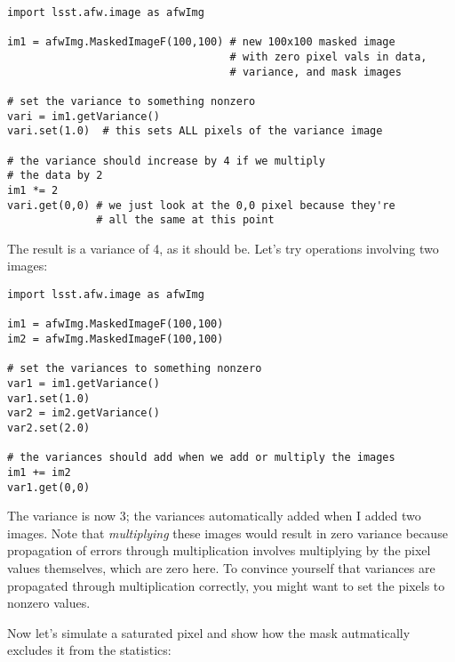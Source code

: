 \begin{verbatim}
import lsst.afw.image as afwImg

im1 = afwImg.MaskedImageF(100,100) # new 100x100 masked image
                                   # with zero pixel vals in data,
                                   # variance, and mask images

# set the variance to something nonzero
vari = im1.getVariance()
vari.set(1.0)  # this sets ALL pixels of the variance image

# the variance should increase by 4 if we multiply
# the data by 2
im1 *= 2
vari.get(0,0) # we just look at the 0,0 pixel because they're
              # all the same at this point
\end{verbatim}

The result is a variance of 4, as it should be. Let's try operations
involving two images:
\begin{verbatim}
import lsst.afw.image as afwImg

im1 = afwImg.MaskedImageF(100,100)
im2 = afwImg.MaskedImageF(100,100)

# set the variances to something nonzero
var1 = im1.getVariance()
var1.set(1.0)
var2 = im2.getVariance()
var2.set(2.0)

# the variances should add when we add or multiply the images
im1 += im2
var1.get(0,0)
\end{verbatim}

The variance is now 3; the variances automatically added when I added
two images.  Note that {\it multiplying} these images would result in
zero variance because propagation of errors through multiplication
involves multiplying by the pixel values themselves, which are zero
here.  To convince yourself that variances are propagated through
multiplication correctly, you might want to set the pixels to nonzero
values.

Now let's simulate a saturated pixel and show how the mask
autmatically excludes it from the statistics:

